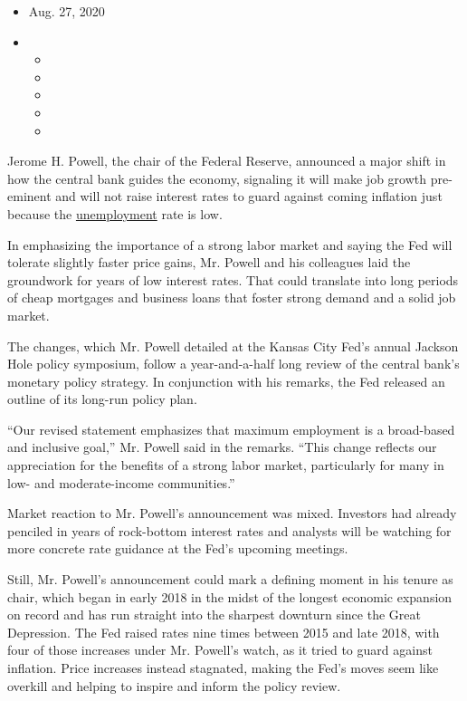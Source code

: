 \begin{itemize}
\item
  Aug. 27, 2020
\item
  \begin{itemize}
  \item
  \item
  \item
  \item
  \item
  \end{itemize}
\end{itemize}

Jerome H. Powell, the chair of the Federal Reserve, announced a major
shift in how the central bank guides the economy, signaling it will make
job growth pre-eminent and will not raise interest rates to guard
against coming inflation just because the
\href{https://www.nytimes3xbfgragh.onion/2020/08/27/business/economy/unemployment-claims.html}{unemployment}
rate is low.

In emphasizing the importance of a strong labor market and saying the
Fed will tolerate slightly faster price gains, Mr. Powell and his
colleagues laid the groundwork for years of low interest rates. That
could translate into long periods of cheap mortgages and business loans
that foster strong demand and a solid job market.

The changes, which Mr. Powell detailed at the Kansas City Fed's annual
Jackson Hole policy symposium, follow a year-and-a-half long review of
the central bank's monetary policy strategy. In conjunction with his
remarks, the Fed released an outline of its long-run policy plan.

``Our revised statement emphasizes that maximum employment is a
broad-based and inclusive goal,'' Mr. Powell said in the remarks. ``This
change reflects our appreciation for the benefits of a strong labor
market, particularly for many in low- and moderate-income communities.''

Market reaction to Mr. Powell's announcement was mixed. Investors had
already penciled in years of rock-bottom interest rates and analysts
will be watching for more concrete rate guidance at the Fed's upcoming
meetings.

Still, Mr. Powell's announcement could mark a defining moment in his
tenure as chair, which began in early 2018 in the midst of the longest
economic expansion on record and has run straight into the sharpest
downturn since the Great Depression. The Fed raised rates nine times
between 2015 and late 2018, with four of those increases under Mr.
Powell's watch, as it tried to guard against inflation. Price increases
instead stagnated, making the Fed's moves seem like overkill and helping
to inspire and inform the policy review.

